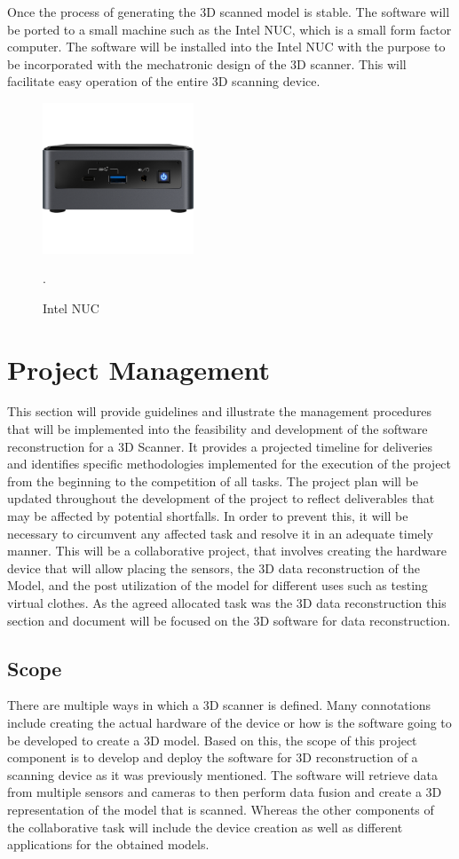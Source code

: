 \documentclass[12pt]{report}
\begin{document}
Once the process of generating the 3D scanned model is stable. The software will be ported to a small machine such as the Intel NUC, which is a small form factor computer. 
The software will be installed into the Intel NUC with the purpose to be incorporated with the mechatronic design of the 3D scanner. This will facilitate easy operation of the entire 3D scanning device.
\begin{figure}[ht]
  \centering
  \includegraphics[width=0.4\textwidth]{Nuc.png}
  \caption{Intel NUC}\citep*{IntelNuc}.
  \label{fig:NUC}
\end{figure}


\chapter{Project Management}
This section will provide guidelines and illustrate the management procedures that will be implemented into the feasibility and development of the software reconstruction for a 3D Scanner. 
It provides a projected timeline for deliveries and identifies specific methodologies implemented for the execution of the project from the beginning to the competition of all tasks.
The project plan will be updated throughout the development of the project to reflect deliverables that may be affected by potential shortfalls.
In order to prevent this, it will be necessary to circumvent any affected task and resolve it in an adequate timely manner. 
This will be a collaborative project, that involves creating the hardware device that will allow placing the sensors, the 3D data reconstruction of the Model, and the post utilization of the model for different uses such as testing virtual clothes. 
As the agreed allocated task was the 3D data reconstruction this section and document will be focused on the 3D software for data reconstruction.

\section{Scope}
There are multiple ways in which a 3D scanner is defined. Many connotations include creating the actual hardware of the device or how is the software going to be developed to create a 3D model. 
Based on this, the scope of this project component is to develop and deploy the software for 3D reconstruction of a scanning device as it was previously mentioned. 
The software will retrieve data from multiple sensors and cameras to then perform data fusion and create a 3D representation of the model that is scanned. Whereas the other components of the collaborative task will include the device creation as well as different applications for the obtained models. 
\end{document}

